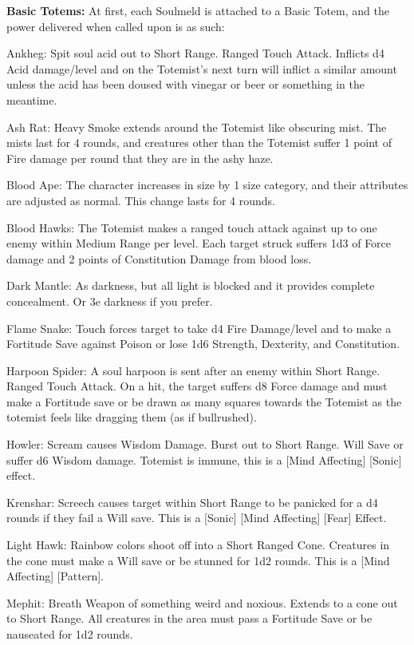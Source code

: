 \textbf{Basic Totems:} At first, each Soulmeld is attached to a Basic Totem, and the power delivered when called upon is as such: 
\begin{itemize*}
\item Ankheg: Spit soul acid out to Short Range. Ranged Touch Attack. Inflicts d4 Acid damage/level and on the Totemist's next turn will inflict a similar amount unless the acid has been doused with vinegar or beer or something in the meantime. 
\item Ash Rat: Heavy Smoke extends around the Totemist like obscuring mist. The mists last for 4 rounds, and creatures other than the Totemist suffer 1 point of Fire damage per round that they are in the ashy haze. 
\item Blood Ape: The character increases in size by 1 size category, and their attributes are adjusted as normal. This change lasts for 4 rounds. 
\item Blood Hawks: The Totemist makes a ranged touch attack against up to one enemy within Medium Range per level. Each target struck suffers 1d3 of Force damage and 2 points of Constitution Damage from blood loss. 
\item Dark Mantle: As darkness, but all light is blocked and it provides complete concealment. Or 3e darkness if you prefer. 
\item Flame Snake: Touch forces target to take d4 Fire Damage/level and to make a Fortitude Save against Poison or lose 1d6 Strength, Dexterity, and Constitution. 
\item Harpoon Spider: A soul harpoon is sent after an enemy within Short Range. Ranged Touch Attack. On a hit, the target suffers d8 Force damage and must make a Fortitude save or be drawn as many squares towards the Totemist as the totemist feels like dragging them (as if bullrushed). 
\item Howler: Scream causes Wisdom Damage. Burst out to Short Range. Will Save or suffer d6 Wisdom damage. Totemist is immune, this is a [Mind Affecting] [Sonic] effect. 
\item Krenshar: Screech causes target within Short Range to be panicked for a d4 rounds if they fail a Will save. This is a [Sonic] [Mind Affecting] [Fear] Effect. 
\item Light Hawk: Rainbow colors shoot off into a Short Ranged Cone. Creatures in the cone must make a Will save or be stunned for 1d2 rounds. This is a [Mind Affecting] [Pattern]. 
\item Mephit: Breath Weapon of something weird and noxious. Extends to a cone out to Short Range. All creatures in the area must pass a Fortitude Save or be nauseated for 1d2 rounds. 

\end{itemize*}
